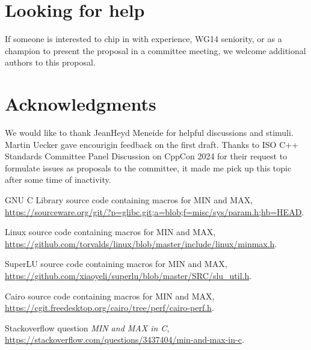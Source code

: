 \documentclass[a4paper,10pt]{scrartcl}
\begin{document}
\section{Looking for help}
If someone is interested to chip in with experience, WG14 seniority, or as a champion to present the proposal in a committee meeting, we welcome additional authors to this proposal.

\section{Acknowledgments}
We would like to thank JeanHeyd Meneide for helpful discussions and stimuli.
Martin Uecker gave encourigin feedback on the first draft.
Thanks to ISO C++ Standards Committee Panel Discussion on CppCon 2024 for their request to formulate
issues as proposals to the committee, it made me pick up this topic after some time of inactivity.

\begin{thebibliography}{9}
GNU C Library source code containing macros for MIN and MAX, \url{https://sourceware.org/git/?p=glibc.git;a=blob;f=misc/sys/param.h;hb=HEAD}.

Linux source code containing macros for MIN and MAX, \url{https://github.com/torvalds/linux/blob/master/include/linux/minmax.h}.

SuperLU source code containing macros for MIN and MAX,\\ \url{https://github.com/xiaoyeli/superlu/blob/master/SRC/slu_util.h}.

Cairo source code containing macros for MIN and MAX,\\ \url{https://cgit.freedesktop.org/cairo/tree/perf/cairo-perf.h}.

Stackoverflow question \emph{MIN and MAX in C},\\ \url{https://stackoverflow.com/questions/3437404/min-and-max-in-c}.
\end{thebibliography}
\end{document}
